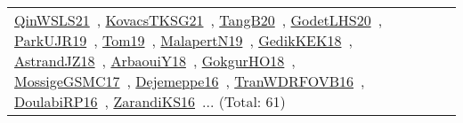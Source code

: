 {\begin{longtable}{lp{3cm}>{\raggedright\arraybackslash}p{6cm}>{\raggedright\arraybackslash}p{6cm}>{\raggedright\arraybackslash}p{8cm}}
\href{works/QinWSLS21.pdf}{QinWSLS21}~\cite{QinWSLS21}, \href{works/KovacsTKSG21.pdf}{KovacsTKSG21}~\cite{KovacsTKSG21}, \href{works/TangB20.pdf}{TangB20}~\cite{TangB20}, \href{works/GodetLHS20.pdf}{GodetLHS20}~\cite{GodetLHS20}, \href{works/ParkUJR19.pdf}{ParkUJR19}~\cite{ParkUJR19}, \href{works/Tom19.pdf}{Tom19}~\cite{Tom19}, \href{works/MalapertN19.pdf}{MalapertN19}~\cite{MalapertN19}, \href{works/GedikKEK18.pdf}{GedikKEK18}~\cite{GedikKEK18}, \href{works/AstrandJZ18.pdf}{AstrandJZ18}~\cite{AstrandJZ18}, \href{works/ArbaouiY18.pdf}{ArbaouiY18}~\cite{ArbaouiY18}, \href{works/GokgurHO18.pdf}{GokgurHO18}~\cite{GokgurHO18}, \href{works/MossigeGSMC17.pdf}{MossigeGSMC17}~\cite{MossigeGSMC17}, \href{works/Dejemeppe16.pdf}{Dejemeppe16}~\cite{Dejemeppe16}, \href{works/TranWDRFOVB16.pdf}{TranWDRFOVB16}~\cite{TranWDRFOVB16}, \href{works/DoulabiRP16.pdf}{DoulabiRP16}~\cite{DoulabiRP16}, \href{works/ZarandiKS16.pdf}{ZarandiKS16}~\cite{ZarandiKS16}... (Total: 61)\\
\end{longtable}
}

